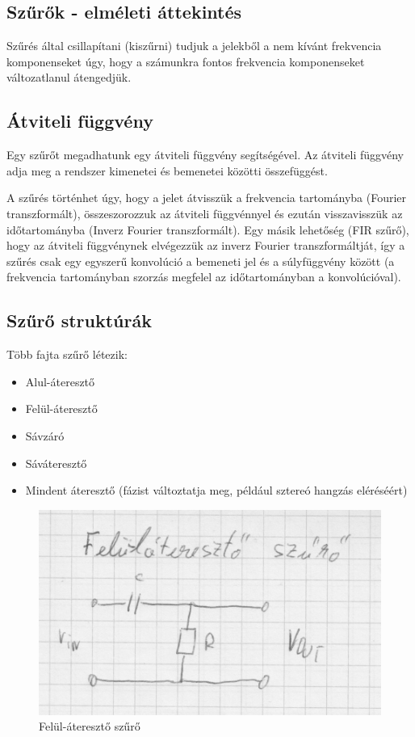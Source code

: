 \subsection{Szűrők - elméleti áttekintés}

Szűrés által csillapítani (kiszűrni) tudjuk a jelekből a nem kívánt frekvencia komponenseket úgy, hogy a számunkra fontos frekvencia komponenseket változatlanul átengedjük.

\subsection{Átviteli függvény}

Egy szűrőt megadhatunk egy átviteli függvény segítségével. Az átviteli függvény adja meg a rendszer kimenetei és bemenetei közötti összefüggést. 

A szűrés történhet úgy, hogy a jelet átvisszük a frekvencia tartományba (Fourier transzformált), összeszorozzuk az átviteli függvénnyel és ezután visszavisszük az időtartományba (Inverz Fourier transzformált). Egy másik lehetőség (FIR szűrő), hogy az átviteli függvénynek elvégezzük az inverz Fourier transzformáltját, így a szűrés csak egy egyszerű konvolúció a bemeneti jel és a súlyfüggvény között (a frekvencia tartományban szorzás megfelel az időtartományban a konvolúcióval).

\subsection{Szűrő struktúrák}

Több fajta szűrő létezik:

\begin{itemize}
    \item Alul-áteresztő
    \item Felül-áteresztő
    \item Sávzáró
    \item Sáváteresztő
    \item Mindent áteresztő (fázist változtatja meg, például sztereó hangzás eléréséért)
\end{itemize}

\begin{figure}[H]
    \centering
    \includegraphics[scale=0.25]{figures/szuro_hp_rc.jpg}
    \caption{Felül-áteresztő szűrő}
\end{figure}

